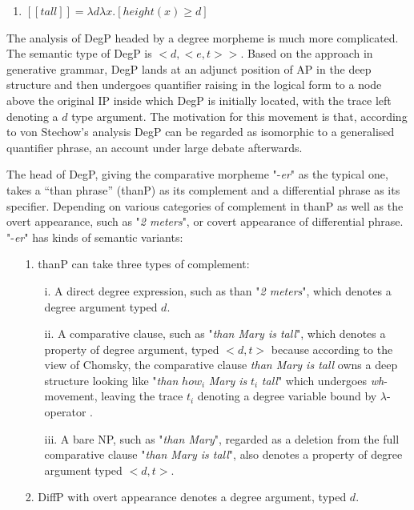 \documentclass{ctexart}
\let \cite \parencite
\begin{document}
\begin{enumerate}[resume]
    \item \label{von_stechow_LE} $[\![tall]\!] = \lambda d \lambda x. [height(x) \geq d]$
\end{enumerate}

The analysis of DegP headed by a degree morpheme is much more complicated. The semantic type of DegP is $<d,<e,t>>$. Based on the approach in generative grammar, DegP lands at an adjunct position of AP in the deep structure and then undergoes quantifier raising in the logical form to a node above the original IP inside which DegP is initially located, with the trace left denoting a $d$ type argument. The motivation for this movement is that, according to von Stechow’s analysis DegP can be regarded as isomorphic to a generalised quantifier phrase, an account under large debate afterwards.

The head of DegP, giving the comparative morpheme "-\textit{er}" as the typical one, takes a “than phrase” (thanP) as its complement and a differential phrase as its specifier. Depending on various categories of complement in thanP as well as the overt appearance, such as "\textit{2 meters}", or covert appearance of differential phrase. "-\textit{er}" has kinds of semantic variants:

\begin{itemize}
\item[1.]
thanP can take three types of complement:

\begin{itemize}
\item[i.]
A direct degree expression, such as than "\textit{2 meters}", which denotes a degree argument typed $d$.
\item[ii.]
A comparative clause, such as "\textit{than Mary is tall}", which denotes a property of degree argument, typed $<d,t>$ because according to the view of Chomsky, the comparative clause \textit{than Mary is tall} owns a deep structure looking like "\textit{than} $how_i$ \textit{Mary is} $t_i$ \textit{tall}" which undergoes \textit{wh}-movement, leaving the trace $t_i$ denoting a degree variable bound by $\lambda$-operator \cite{chomsky1977}.
\item[iii.]
A bare NP, such as "\textit{than Mary}", regarded as a deletion from the full comparative clause "\textit{than Mary is tall}", also denotes a property of degree argument typed $<d,t>$.
\end{itemize}

\item[2.]
DiffP with overt appearance denotes a degree argument, typed $d$.

\end{itemize}
\end{document}
